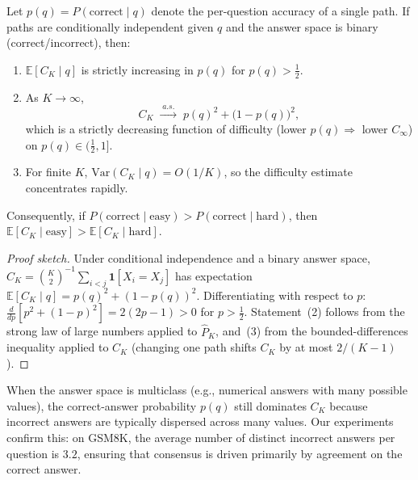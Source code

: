 \begin{proposition}
\label{prop:monotone}
Let $p(q) = P(\text{correct}\!\mid\! q)$ denote the per-question
accuracy of a single path.
If paths are conditionally independent given $q$ and the answer space
is binary (correct/incorrect), then:
\begin{enumerate}[nosep,leftmargin=*]
  \item $\mathbb{E}[C_K \mid q]$ is strictly increasing in $p(q)$ for
        $p(q) > \tfrac{1}{2}$.
  \item As $K \to \infty$,
    \begin{equation}
      C_K \;\xrightarrow{\;a.s.\;}\; p(q)^{2} + \bigl(1 - p(q)\bigr)^{2},
      \label{eq:consensus-limit}
    \end{equation}
    which is a strictly decreasing function of difficulty
    (lower $p(q) \Rightarrow$ lower $C_\infty$) on $p(q)\in(\tfrac12,1]$.
  \item For finite $K$, $\mathrm{Var}(C_K \mid q) = O(1/K)$, so the
        difficulty estimate concentrates rapidly.
\end{enumerate}
Consequently, if $P(\textrm{correct}\!\mid\!\textrm{easy}) >
P(\textrm{correct}\!\mid\!\textrm{hard})$, then
$\mathbb{E}[C_K \mid \textrm{easy}] > \mathbb{E}[C_K \mid \textrm{hard}]$.
\end{proposition}

\begin{proof}[Proof sketch]
Under conditional independence and a binary answer space,
$C_K = \binom{K}{2}^{-1}\sum_{i<j}\mathbf{1}[X_i = X_j]$
has expectation
$\mathbb{E}[C_K \mid q] = p(q)^2 + (1-p(q))^2$.
Differentiating with respect to $p$:
$\frac{d}{dp}[p^2 + (1-p)^2] = 2(2p - 1) > 0$ for $p > \tfrac{1}{2}$.
Statement~(2) follows from the strong law of large numbers applied to
$\hat{P}_K$, and~(3) from the bounded-differences inequality applied
to $C_K$ (changing one path shifts $C_K$ by at most $2/(K-1)$).
\end{proof}

\begin{remark}
When the answer space is multiclass (e.g., numerical answers with many
possible values), the correct-answer probability $p(q)$ still dominates
$C_K$ because incorrect answers are typically dispersed across many
values.
Our experiments confirm this: on GSM8K, the average number of distinct
incorrect answers per question is $3.2$, ensuring that consensus is
driven primarily by agreement on the correct answer.
\end{remark}

